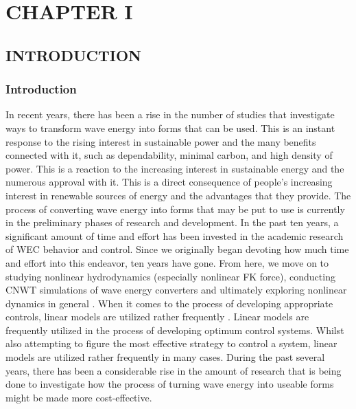 \section*{\centering\fontsize{14}{16}\selectfont CHAPTER I}

\subsection*{\centering\fontsize{12}{14}\selectfont INTRODUCTION}

\subsubsection*{\fontsize{12}{14} Introduction}

\fontsize{12}{14}\selectfont
In recent years, there has been a rise in the number of studies that investigate ways to transform wave energy into forms that can be used. This is an instant response to the rising interest in sustainable power and the many benefits connected with it, such as dependability, minimal carbon, and high density of power.\cite{ref1} This is a reaction to the increasing interest in sustainable energy and the numerous approval with it. This is a direct consequence of people's increasing interest in renewable sources of energy and the advantages that they provide. The process of converting wave energy into forms that may be put to use is currently in the preliminary phases of research and development.\cite{ref2,ref3,ref4} In the past ten years, a significant amount of time and effort has been invested in the academic research of WEC behavior and control. Since we originally began devoting how much time and effort into this endeavor, ten years have gone. From here, we move on to studying nonlinear hydrodynamics (especially nonlinear FK force), conducting CNWT simulations of wave energy converters \cite{ref3} and ultimately exploring nonlinear dynamics in general \cite{ref4}. When it comes to the process of developing appropriate controls, linear models are utilized rather frequently \cite{ref5}. Linear models are frequently utilized in the process of developing optimum control systems. Whilst also attempting to figure the most effective strategy to control a system, linear models are utilized rather frequently in many cases.\cite{ref6} During the past several years, there has been a considerable rise in the amount of research that is being done to investigate how the process of turning wave energy into useable forms might be made more cost-effective.

